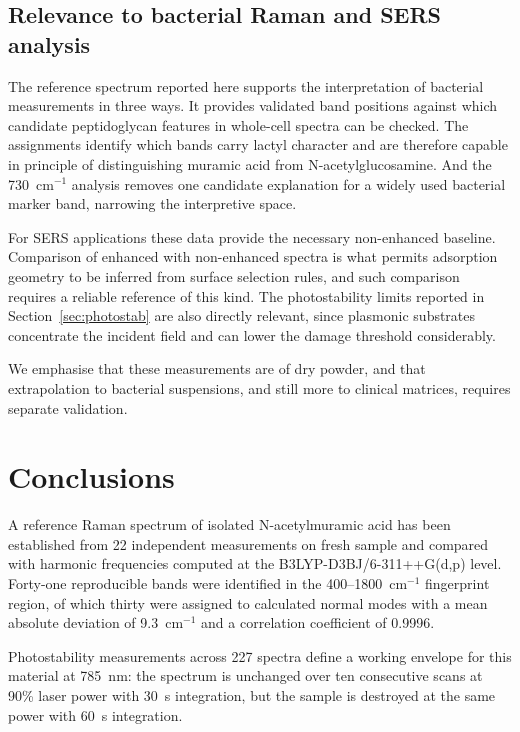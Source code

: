 \documentclass[preprint,12pt]{elsarticle}
\newcommand{\wn}{\ensuremath{\mathrm{cm}^{-1}}}
\begin{document}
\subsection{Relevance to bacterial Raman and SERS analysis}

The reference spectrum reported here supports the interpretation of bacterial
measurements in three ways. It provides validated band positions against which
candidate peptidoglycan features in whole-cell spectra can be checked. The
assignments identify which bands carry lactyl character and are therefore
capable in principle of distinguishing muramic acid from N-acetylglucosamine.
And the 730~\wn{} analysis removes one candidate explanation for a widely used
bacterial marker band, narrowing the interpretive space.

For SERS applications these data provide the necessary non-enhanced baseline.
Comparison of enhanced with non-enhanced spectra is what permits adsorption
geometry to be inferred from surface selection rules, and such comparison
requires a reliable reference of this kind. The photostability limits reported
in Section~\ref{sec:photostab} are also directly relevant, since plasmonic
substrates concentrate the incident field and can lower the damage threshold
considerably.

We emphasise that these measurements are of dry powder, and that extrapolation
to bacterial suspensions, and still more to clinical matrices, requires separate
validation.

\section{Conclusions}

A reference Raman spectrum of isolated N-acetylmuramic acid has been established
from 22 independent measurements on fresh sample and compared with harmonic
frequencies computed at the B3LYP-D3BJ/6-311++G(d,p) level. Forty-one
reproducible bands were identified in the 400--1800~\wn{} fingerprint region, of
which thirty were assigned to calculated normal modes with a mean absolute
deviation of 9.3~\wn{} and a correlation coefficient of 0.9996.

Photostability measurements across 227 spectra define a working envelope for
this material at 785~nm: the spectrum is unchanged over ten consecutive scans at
90\% laser power with 30~s integration, but the sample is destroyed at the same
power with 60~s integration.
\end{document}
